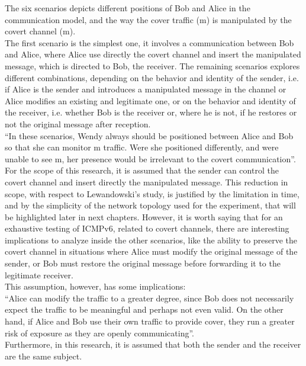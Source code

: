 \documentclass[12pt]{article}
\begin{document}
The six scenarios depicts different positions of Bob and Alice in the communication model, and the way the cover traffic (m) is manipulated by the covert channel (m\textprime).\\
The first scenario is the simplest one, it 
involves a communication between Bob and Alice, where Alice use directly the covert channel and insert the manipulated message, which is directed to Bob, the receiver. The remaining scenarios explores different 
combinations, depending on the behavior and identity of the sender, i.e. if Alice is the sender and introduces a manipulated message in the channel or Alice modifies an existing and legitimate one, or on the behavior and 
identity of the receiver, i.e. whether Bob is the receiver or, where he is not, if he restores or not the original message after reception.\\

``In these scenarios, Wendy always should be positioned between Alice and Bob so that she can monitor m\textprime\hspace{2pt} traffic. Were she positioned differently, and were unable to see m\textprime, her presence would be 
irrelevant to the covert communication''.\\
For the scope of this research, it is assumed that the sender can control the covert channel and insert directly the manipulated message. This reduction in scope, with respect to Lewandowski's study, is justified by the 
limitation in time, and by the simplicity of the network topology used for the experiment, that will be highlighted later in next chapters. However, it is worth saying that for an exhaustive testing of ICMPv6, related to 
covert channels, there are interesting implications to analyze inside the other scenarios, like the ability to preserve the covert channel in situations where Alice must modify the original message of the sender, or Bob 
must restore the original message before forwarding it to the legitimate receiver.\\
This assumption, however, has some implications:\\
``Alice can modify the traffic to a greater degree, since Bob does not necessarily expect the traffic to be meaningful and perhaps not even valid. On the other hand, if Alice and Bob use their own traffic to provide 
cover, they run a greater risk of exposure as they are openly communicating''.\\
Furthermore, in this research, it is assumed that both the sender and the receiver are the same subject.\\
\end{document}
